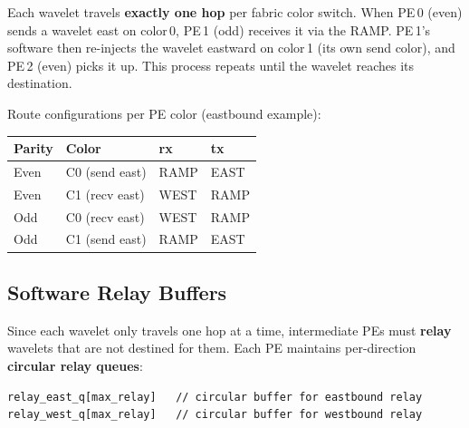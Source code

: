 \documentclass[11pt,letterpaper]{article}
\begin{document}
Each wavelet travels \textbf{exactly one hop} per fabric color switch. When PE\,0 (even) sends a wavelet east on color\,0, PE\,1 (odd) receives it via the RAMP. PE\,1's software then re-injects the wavelet eastward on color\,1 (its own send color), and PE\,2 (even) picks it up. This process repeats until the wavelet reaches its destination.

\begin{center}
\end{center}

Route configurations per PE color (eastbound example):
\begin{center}
\renewcommand{\arraystretch}{1.2}
\begin{tabular}{llll}
\toprule
\textbf{Parity} & \textbf{Color} & \textbf{rx} & \textbf{tx} \\
\midrule
Even & C0 (send east) & RAMP & EAST \\
Even & C1 (recv east) & WEST & RAMP \\
Odd  & C0 (recv east) & WEST & RAMP \\
Odd  & C1 (send east) & RAMP & EAST \\
\bottomrule
\end{tabular}
\end{center}

\subsection{Software Relay Buffers}

Since each wavelet only travels one hop at a time, intermediate PEs must \textbf{relay} wavelets that are not destined for them. Each PE maintains per-direction \textbf{circular relay queues}:

\begin{lstlisting}
relay_east_q[max_relay]   // circular buffer for eastbound relay
relay_west_q[max_relay]   // circular buffer for westbound relay
\end{lstlisting}
\end{document}
